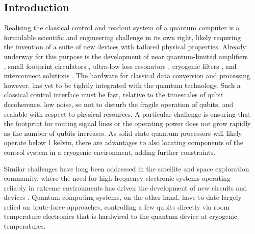 \subsection{Introduction}
Realising the classical control and readout system of a quantum computer  is a formidable scientific and engineering challenge in its own right, likely requiring the invention of a suite of new devices with tailored physical properties. Already underway for this purpose is the development of near quantum-limited amplifiers \cite{doi:10.1063/1.2773988,nature09035,PhysRevB.83.134501,PhysRevLett.108.147701}, small footprint circulators \cite{PhysRevX.4.021019}, ultra-low loss resonators \cite{doi:10.1063/1.4710520,6473832}, cryogenic filters \cite{doi:10.1063/1.3133362}, and interconnect solutions \cite{Wenner_2011,doi:10.1063/1.3681195,doi:10.1063/1.4900948}. The hardware for classical data conversion and processing however, has yet to be tightly integrated with the quantum technology. Such a classical control interface must be fast, relative to the timescales of qubit decoherence, low noise, so not to disturb the fragile operation of qubits, and scalable with respect to physical resources\cite{PhysRevX.2.031007,VanMeter:2013:BBQ:2507771.2494568,srep04657}. A particular challenge is ensuring that the footprint for routing signal lines or the operating power does not grow rapidly as the number of qubits increases\cite{doi:10.1142/S021974991000637X,divincenzo_crit}. As solid-state quantum processors will likely operate below 1 kelvin\cite{Devoret1169,nature10786,PhysRevLett.107.240501,PhysRevA.57.120,PhysRevB.88.035121}, there are advantages to also locating components of the control system in a cryogenic environment, adding further constraints.

Similar challenges have long been addressed in the satellite and space exploration community\cite{4384375}, where the need for high-frequency electronic systems operating reliably in extreme environments has driven the development of new circuits and devices \cite{cressler2012extreme}. Quantum computing systems, on the other hand, have to date largely relied on brute-force approaches, controlling a few qubits directly via room temperature electronics that is hardwired to the quantum device at cryogenic temperatures.

